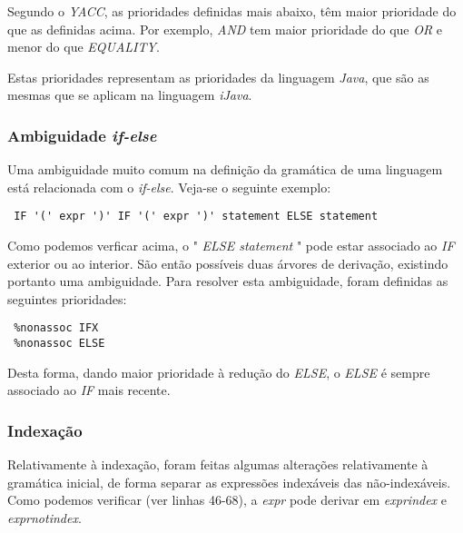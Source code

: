 \documentclass[11pt,a4paper]{article}
\begin{document}
Segundo o \textit{YACC}, as prioridades definidas mais abaixo, têm maior prioridade do que as definidas acima. Por exemplo, \textit{AND} tem maior prioridade do que \textit{OR} e menor do que \textit{EQUALITY}. 

Estas prioridades representam as prioridades da linguagem \textit{Java}, que são as mesmas que se aplicam na linguagem \textit{iJava}.

\subsubsection{Ambiguidade \textit{if-else}}

Uma ambiguidade muito comum na definição da gramática de uma linguagem está relacionada com o \textit{if-else}. Veja-se o seguinte exemplo:

\vspace{0.3cm}
\begin{lstlisting}
 IF '(' expr ')' IF '(' expr ')' statement ELSE statement  
\end{lstlisting}
 
\vspace{0.3cm}

Como podemos verficar acima, o " \textit{ELSE statement} " pode estar associado ao \textit{IF} exterior ou ao interior. São então possíveis duas árvores de derivação, existindo portanto uma ambiguidade. Para resolver esta ambiguidade, foram definidas as seguintes prioridades:

\vspace{0.3cm}

\begin{lstlisting}
 %nonassoc IFX
 %nonassoc ELSE   
\end{lstlisting}

\vspace{0.3cm}

Desta forma, dando maior prioridade à redução do \textit{ELSE}, o \textit{ELSE} é sempre associado ao \textit{IF} mais recente.

\subsubsection{Indexação}

Relativamente à indexação, foram feitas algumas alterações relativamente à gramática inicial, de forma separar as expressões indexáveis das não-indexáveis. Como podemos verificar (ver linhas 46-68), a \textit{expr} pode derivar em \textit{exprindex} e \textit{exprnotindex}.
\end{document}
